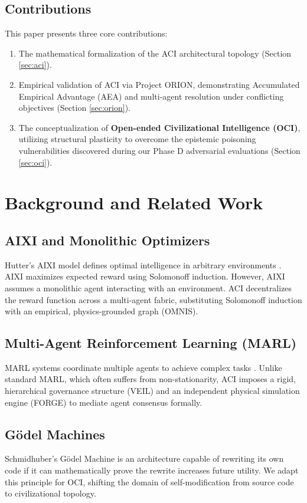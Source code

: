 \documentclass[11pt,twocolumn]{article}
\begin{document}
\subsection{Contributions}
This paper presents three core contributions:
\begin{enumerate}
    \item The mathematical formalization of the ACI architectural topology (Section \ref{sec:aci}).
    \item Empirical validation of ACI via Project ORION, demonstrating Accumulated Empirical Advantage (AEA) and multi-agent resolution under conflicting objectives (Section \ref{sec:orion}).
    \item The conceptualization of \textbf{Open-ended Civilizational Intelligence (OCI)}, utilizing structural plasticity to overcome the epistemic poisoning vulnerabilities discovered during our Phase D adversarial evaluations (Section \ref{sec:oci}).
\end{enumerate}

\section{Background and Related Work}
\label{sec:background}
\subsection{AIXI and Monolithic Optimizers}
Hutter's AIXI model defines optimal intelligence in arbitrary environments \cite{hutter2004universal}. AIXI maximizes expected reward using Solomonoff induction. However, AIXI assumes a monolithic agent interacting with an environment. ACI decentralizes the reward function across a multi-agent fabric, substituting Solomonoff induction with an empirical, physics-grounded graph (OMNIS).

\subsection{Multi-Agent Reinforcement Learning (MARL)}
MARL systems coordinate multiple agents to achieve complex tasks \cite{busoniu2008comprehensive}. Unlike standard MARL, which often suffers from non-stationarity, ACI imposes a rigid, hierarchical governance structure (VEIL) and an independent physical simulation engine (FORGE) to mediate agent consensus formally.

\subsection{G\"odel Machines}
Schmidhuber's G\"odel Machine \cite{schmidhuber2006godel} is an architecture capable of rewriting its own code if it can mathematically prove the rewrite increases future utility. We adapt this principle for OCI, shifting the domain of self-modification from source code to civilizational topology.
\end{document}
